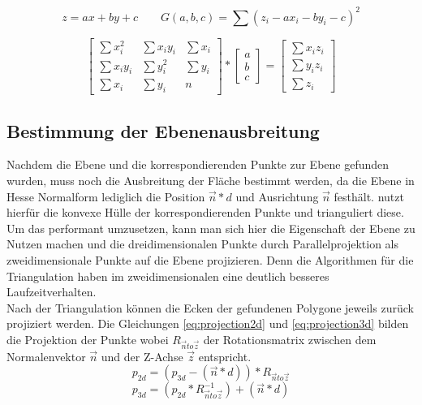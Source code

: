 \begin{equation} \label{eq:least-squares}
z = ax + by + c   \qquad G(a, b, c) = \sum {\left(z_i - ax_i - by_i - c\right)}^2
\end{equation}

\begin{equation} \label{eq:least-squares-solution}
\begin{bmatrix}
\sum x_i^2 & \sum x_iy_i & \sum x_i\\ 
\sum x_iy_i  & \sum y_i^2  & \sum y_i \\ 
\sum x_i & \sum y_i  & n
\end{bmatrix}
*
\begin{bmatrix}
a\\ 
b\\ 
c
\end{bmatrix}
=
\begin{bmatrix}
\sum x_iz_i\\ 
\sum y_iz_i\\ 
\sum z_i
\end{bmatrix}
\end{equation}

\subsection{Bestimmung der Ebenenausbreitung}

Nachdem die Ebene und die korrespondierenden Punkte zur Ebene gefunden wurden, muss noch die Ausbreitung der Fläche bestimmt werden, da die Ebene in Hesse Normalform lediglich die Position \(\vec{n} * d\) und Ausrichtung \(\vec{n}\) festhält. \citet{PlanarSurfaceMapping} nutzt hierfür die konvexe Hülle der korrespondierenden Punkte und trianguliert diese. Um das performant umzusetzen, kann man sich hier die Eigenschaft der Ebene zu Nutzen machen und die dreidimensionalen Punkte durch Parallelprojektion als zweidimensionale Punkte auf die Ebene projizieren. Denn die Algorithmen für die Triangulation haben im zweidimensionalen eine deutlich besseres Laufzeitverhalten. \\

Nach der Triangulation können die Ecken der gefundenen Polygone jeweils zurück projiziert werden. Die Gleichungen \ref{eq:projection2d} und \ref{eq:projection3d} bilden die Projektion der Punkte wobei \(R_{\vec{n}to\vec{z}}\) der Rotationsmatrix zwischen dem Normalenvektor \(\vec{n}\) und der Z-Achse \(\vec{z}\) entspricht.\\

\begin{equation} \label{eq:projection2d}
p_{2d} = (p_{3d} - (\vec{n}*d)) * R_{\vec{n}to\vec{z}}
\end{equation}
\begin{equation} \label{eq:projection3d}
p_{3d} = (p_{2d} * R_{\vec{n}to\vec{z}}^{-1}) + (\vec{n}*d)
\end{equation}


